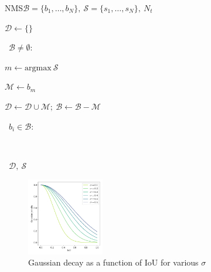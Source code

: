 \begin{pseudofunc}{NMS}{\(\mathcal{B}=\{b_1,\ldots,b_N \},~\mathcal{S}=\{s_1,\ldots,s_N \},~N_t\)}
  \item \(\mathcal{D} \leftarrow \{ \} \)
  \item \pwhile~\(\mathcal{B} \neq \emptyset \):
  \begin{pseudoloop}
    \item \(m \leftarrow \text{argmax}~\mathcal{S}\)
    \item \(\mathcal{M} \leftarrow b_m\)
    \item \(\mathcal{D} \leftarrow \mathcal{D} \cup \mathcal{M};~ \mathcal{B} \leftarrow \mathcal{B} - \mathcal{M}\)
    \item \pfor~\(b_i \in \mathcal{B}\):
    \vspace{6pt}
    \begin{pseudoloop}
      \vspace{5pt}\\
    \end{pseudoloop}
  \end{pseudoloop}\vspace{5pt}
  \item \pret~\(\mathcal{D},~\mathcal{S}\)
\end{pseudofunc}

\begin{figure}
  \centering
  \includegraphics[width=0.3\textwidth]{figs/method/gausian_penelty.pdf}
  \caption{Gaussian decay as a function of IoU for various \( \sigma \)}\label{fig:gauss}
\end{figure}

